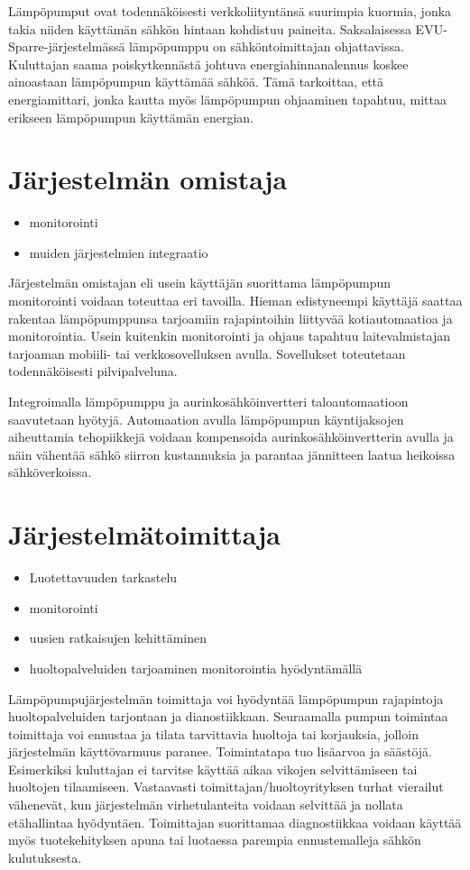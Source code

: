   Lämpöpumput ovat todennäköisesti verkkoliityntänsä suurimpia kuormia, jonka takia niiden käyttämän sähkön hintaan kohdistuu paineita. Saksalaisessa EVU-Sparre-järjestelmässä lämpöpumppu on sähköntoimittajan ohjattavissa. Kuluttajan saama poiskytkennästä johtuva energiahinnanalennus koskee ainoastaan lämpöpumpun käyttämää sähköä. Tämä tarkoittaa, että energiamittari, jonka kautta myös lämpöpumpun ohjaaminen tapahtuu, mittaa erikseen lämpöpumpun käyttämän energian.\parencite{enwg, VDEARN4100}

\section{Järjestelmän omistaja}
  \begin{itemize}
    \item monitorointi
    \item muiden järjestelmien integraatio
  \end{itemize}

  Järjestelmän omistajan eli usein käyttäjän suorittama lämpöpumpun monitorointi voidaan toteuttaa eri tavoilla. Hieman edistyneempi käyttäjä saattaa rakentaa lämpöpumppunsa tarjoamiin rajapintoihin liittyvää kotiautomaatioa ja monitorointia. Usein kuitenkin monitorointi ja ohjaus tapahtuu laitevalmistajan tarjoaman mobiili- tai verkkosovelluksen avulla. Sovellukset toteutetaan todennäköisesti pilvipalveluna.

  Integroimalla lämpöpumppu ja aurinkosähköinvertteri taloautomaatioon saavutetaan hyötyjä. Automaation avulla lämpöpumpun käyntijaksojen aiheuttamia tehopiikkejä voidaan kompensoida aurinkosähköinvertterin avulla ja näin vähentää sähkö siirron kustannuksia ja parantaa jännitteen laatua heikoissa sähköverkoissa.

\section{Järjestelmätoimittaja}
  \begin{itemize}
    \item Luotettavuuden tarkastelu
    \item monitorointi
    \item uusien ratkaisujen kehittäminen
    \item huoltopalveluiden tarjoaminen monitorointia hyödyntämällä
  \end{itemize}

  Lämpöpumpujärjestelmän toimittaja voi hyödyntää lämpöpumpun rajapintoja huoltopalveluiden tarjontaan ja dianostiikkaan. Seuraamalla pumpun toimintaa toimittaja voi ennustaa ja tilata tarvittavia huoltoja tai korjauksia, jolloin järjestelmän käyttövarmuus paranee. Toimintatapa tuo lisäarvoa ja säästöjä. Esimerkiksi kuluttajan ei tarvitse käyttää aikaa vikojen selvittämiseen tai huoltojen tilaamiseen. Vastaavasti toimittajan/huoltoyrityksen turhat vierailut vähenevät, kun järjestelmän virhetulanteita voidaan selvittää ja nollata etähallintaa hyödyntäen. Toimittajan suorittamaa diagnostiikkaa voidaan käyttää myös tuotekehityksen apuna tai luotaessa parempia ennustemalleja sähkön kulutuksesta.

